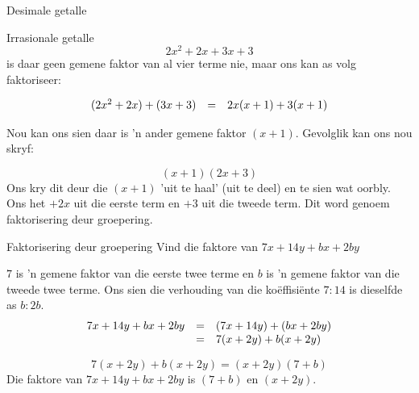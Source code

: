 \begin{Aktiwiteit}{Desimale getalle}
\begin{aktiwiteit}{Irrasionale getalle}
\begin{equation*}
2{x}^{2}+2x+3x+3
\end{equation*}
is daar geen gemene faktor van al vier terme nie, maar ons kan as volg faktoriseer:\par 
\nopagebreak\noindent{}

\begin{equation*}
\begin{array}{ccl}
(2{x}^{2}+2x)+(3x+3) &=& 2x(x+1)+3(x+1) \hfill \hfill
\end{array}
\end{equation*}


Nou kan ons sien daar is ’n ander gemene faktor $(x+1)$. Gevolglik kan ons nou skryf:\par 
\begin{equation*}
(x+1)(2x+3)
\end{equation*}
Ons kry dit deur die $(x+1)$ ’uit te haal’ (uit te deel) en te sien wat oorbly. Ons het $+2x$ uit die eerste term en $+3$ uit die tweede term. Dit word genoem faktorisering deur groepering.\par 



\begin{wex}{Faktorisering deur groepering }{Vind die faktore van $7x+14y+bx+2by$}
{


 $7$ is ’n gemene faktor van die eerste twee terme en $b$ is ’n gemene faktor van die tweede twee terme. Ons sien die verhouding van die ko\"effisi\"ente $7:14$ is dieselfde as $b:2b$.
\begin{equation*}
 \begin{array}{ccl}

7x+14y+bx+2by&=& (7x+14y)+(bx+2by)  \hfill\\ 
&=&7(x+2y)+b(x+2y) \hfill 
\end{array}
\end{equation*}


\begin{equation*}
7(x+2y)+b(x+2y)=(x+2y)(7+b)
\end{equation*}
Die faktore van $7x+14y+bx+2by$ is $(7+b)$ en $(x+2y)$.
\par 

}
\end{wex}


\end{aktiwiteit}
\end{Aktiwiteit}
